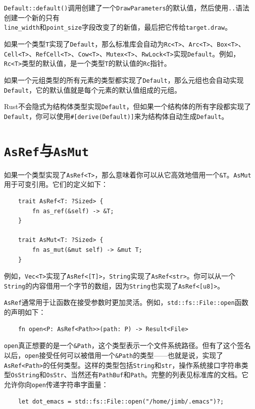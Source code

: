 \texttt{Default::default()}调用创建了一个\texttt{DrawParameters}的默认值，然后使用\texttt{..}语法创建一个新的只有\\
\texttt{line\_width}和\texttt{point\_size}字段改变了的新值，最后把它传给\texttt{target.draw}。

如果一个类型\texttt{T}实现了\texttt{Default}，那么标准库会自动为\texttt{Rc<T>}、\texttt{Arc<T>}、\texttt{Box<T>}、\texttt{Cell<T>}、\texttt{RefCell<T>}、\texttt{Cow<T>}、\texttt{Mutex<T>}、\texttt{RwLock<T>}实现\texttt{Default}。例如，\texttt{Rc<T>}类型的默认值，是一个类型\texttt{T}的默认值的\texttt{Rc}指针。

如果一个元组类型的所有元素的类型都实现了\texttt{Default}，那么元组也会自动实现\texttt{Default}，它的默认值就是每个元素的默认值组成的元组。

Rust不会隐式为结构体类型实现\texttt{Default}，但如果一个结构体的所有字段都实现了\texttt{Default}，你可以使用\texttt{\#[derive(Default)]}来为结构体自动生成\texttt{Default}。

\section{\texttt{AsRef}与\texttt{AsMut}}\label{asref}

如果一个类型实现了\texttt{AsRef<T>}，那么意味着你可以从它高效地借用一个\texttt{\&T}。\texttt{AsMut}用于可变引用。它们的定义如下：
\begin{verbatim}
    trait AsRef<T: ?Sized> {
        fn as_ref(&self) -> &T;
    }

    trait AsMut<T: ?Sized> {
        fn as_mut(&mut self) -> &mut T;
    }
\end{verbatim}

例如，\texttt{Vec<T>}实现了\texttt{AsRef<[T]>}，\texttt{String}实现了\texttt{AsRef<str>}。你可以从一个\texttt{String}的内容借用一个字节的数组，因为\texttt{String}也实现了\texttt{AsRef<[u8]>}。

\texttt{AsRef}通常用于让函数在接受参数时更加灵活。例如，\texttt{std::fs::File::open}函数的声明如下：
\begin{verbatim}
    fn open<P: AsRef<Path>>(path: P) -> Result<File>
\end{verbatim}

\texttt{open}真正想要的是一个\texttt{\&Path}，这个类型表示一个文件系统路径。但有了这个签名以后，\texttt{open}接受任何可以被借用一个\texttt{\&Path}的类型——也就是说，实现了\texttt{AsRef<Path>}的任何类型。这样的类型包括\texttt{String}和\texttt{str}，操作系统接口字符串类型\texttt{OsString}和\texttt{OsStr}、当然还有\texttt{PathBuf}和\texttt{Path}。完整的列表见标准库的文档。它允许你向\texttt{open}传递字符串字面量：
\begin{verbatim}
    let dot_emacs = std::fs::File::open("/home/jimb/.emacs")?;
\end{verbatim}

